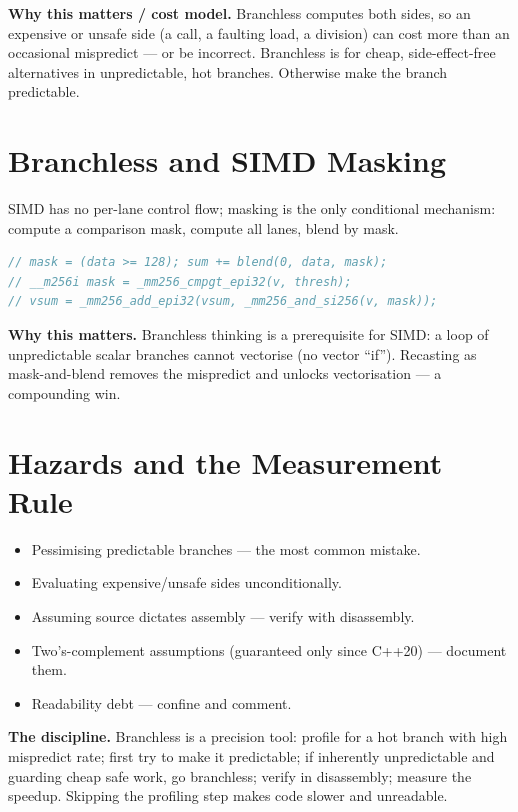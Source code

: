 \textbf{Why this matters / cost model.} Branchless computes both sides, so an expensive or unsafe side (a call, a faulting load, a division) can cost more than an occasional mispredict --- or be incorrect. Branchless is for cheap, side-effect-free alternatives in unpredictable, hot branches. Otherwise make the branch predictable.

\section{Branchless and SIMD Masking}
SIMD has no per-lane control flow; masking is the only conditional mechanism: compute a comparison mask, compute all lanes, blend by mask.

\begin{lstlisting}[language=C++, caption={SIMD conditional accumulation via masking. AVX, x86-specific. Min standard: C++17.}]
// mask = (data >= 128); sum += blend(0, data, mask);
// __m256i mask = _mm256_cmpgt_epi32(v, thresh);
// vsum = _mm256_add_epi32(vsum, _mm256_and_si256(v, mask));
\end{lstlisting}

\textbf{Why this matters.} Branchless thinking is a prerequisite for SIMD: a loop of unpredictable scalar branches cannot vectorise (no vector ``if''). Recasting as mask-and-blend removes the mispredict and unlocks vectorisation --- a compounding win.

\section{Hazards and the Measurement Rule}
\begin{itemize}
\item Pessimising predictable branches --- the most common mistake.
\item Evaluating expensive/unsafe sides unconditionally.
\item Assuming source dictates assembly --- verify with disassembly.
\item Two's-complement assumptions (guaranteed only since C++20) --- document them.
\item Readability debt --- confine and comment.
\end{itemize}

\textbf{The discipline.} Branchless is a precision tool: profile for a hot branch with high mispredict rate; first try to make it predictable; if inherently unpredictable and guarding cheap safe work, go branchless; verify in disassembly; measure the speedup. Skipping the profiling step makes code slower and unreadable.
